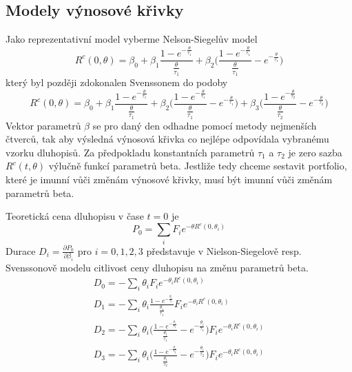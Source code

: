 \documentclass[a4paper]{book}
\begin{document}
\subsection{Modely výnosové křivky}

Jako reprezentativní model vyberme Nelson-Siegelův model
\begin{equation*}
R^c(0, \theta) = \beta_0 + \beta_1 \frac{1 - e^{-\frac{\theta}{\tau_1}}}{\frac{\theta}{\tau_1}} + \beta_2 \Bigg( \frac{1 - e^{-\frac{\theta}{\tau_1}}}{\frac{\theta}{\tau_1}} - e^{-\frac{\theta}{\tau_1}}\Bigg)
\end{equation*}
který byl později zdokonalen Svenssonem do podoby
\begin{equation*}
R^c(0, \theta) = \beta_0 + \beta_1 \frac{1 - e^{-\frac{\theta}{\tau_1}}}{\frac{\theta}{\tau_1}} + \beta_2 \Bigg( \frac{1 - e^{-\frac{\theta}{\tau_1}}}{\frac{\theta}{\tau_1}} - e^{-\frac{\theta}{\tau_1}}\Bigg) + \beta_3 \Bigg( \frac{1 - e^{-\frac{\theta}{\tau_2}}}{\frac{\theta}{\tau_2}} - e^{-\frac{\theta}{\tau_2}}\Bigg)
\end{equation*}
Vektor parametrů $\beta$ se pro daný den odhadne pomocí metody nejmenších čtverců, tak aby výsledná výnosová křivka co nejlépe odpovídala vybranému vzorku dluhopisů. Za předpokladu konstantních parametrů $\tau_1$ a $\tau_2$ je zero sazba $R^c(t, \theta)$ výlučně funkcí parametrů beta. Jestliže tedy chceme sestavit portfolio, které je imunní vůči změnám výnosové křivky, musí být imunní vůči změnám parametrů beta.

Teoretická cena dluhopisu v čase $t=0$ je
\begin{equation}
P_0 = \sum_i F_i e^{-\theta R^c(0,\theta_i)}
\end{equation}
Durace $D_i = \frac{\partial P_0}{\partial \beta_i}$ pro $i = 0, 1, 2, 3$ představuje v Nielson-Siegelově resp. Svenssonově modelu citlivost ceny dluhopisu na změnu parametrů beta.
\begin{gather*}
D_0 = - \sum_i \theta_i F_i e^{-\theta_i R^c(0, \theta_i)} \\
D_1 = - \sum_i \theta_i \frac{1 - e^{-\frac{\theta_i}{\tau_1}}}{\frac{\theta_i}{\tau_1}} F_i e^{-\theta_i R^c(0, \theta_i)} \\
D_2 = - \sum_i \theta_i \Bigg( \frac{1 - e^{-\frac{\theta_i}{\tau_1}}}{\frac{\theta_i}{\tau_1}} - e^{-\frac{\theta_i}{\tau_1}}\Bigg)F_i e^{-\theta_i R^c(0, \theta_i)} \\
D_3 = - \sum_i \theta_i \Bigg( \frac{1 - e^{-\frac{\theta_i}{\tau_2}}}{\frac{\theta_i}{\tau_2}} - e^{-\frac{\theta_i}{\tau_2}}\Bigg)F_i e^{-\theta_i R^c(0, \theta_i)} \\
\end{gather*}
\end{document}
